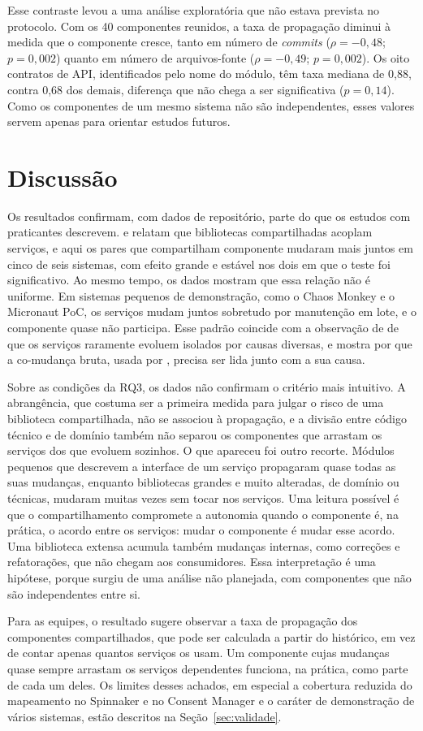 Esse contraste levou a uma análise exploratória que não estava prevista no protocolo. Com os 40 componentes reunidos, a taxa de propagação diminui à medida que o componente cresce, tanto em número de \textit{commits} ($\rho = -0{,}48$; $p = 0{,}002$) quanto em número de arquivos-fonte ($\rho = -0{,}49$; $p = 0{,}002$). Os oito contratos de API, identificados pelo nome do módulo, têm taxa mediana de 0,88, contra 0,68 dos demais, diferença que não chega a ser significativa ($p = 0{,}14$). Como os componentes de um mesmo sistema não são independentes, esses valores servem apenas para orientar estudos futuros.

\section{Discussão}
\label{sec:discussao}

Os resultados confirmam, com dados de repositório, parte do que os estudos com praticantes descrevem.  e  relatam que bibliotecas compartilhadas acoplam serviços, e aqui os pares que compartilham componente mudaram mais juntos em cinco de seis sistemas, com efeito grande e estável nos dois em que o teste foi significativo. Ao mesmo tempo, os dados mostram que essa relação não é uniforme. Em sistemas pequenos de demonstração, como o Chaos Monkey e o Micronaut PoC, os serviços mudam juntos sobretudo por manutenção em lote, e o componente quase não participa. Esse padrão coincide com a observação de  de que os serviços raramente evoluem isolados por causas diversas, e mostra por que a co-mudança bruta, usada por , precisa ser lida junto com a sua causa.

Sobre as condições da RQ3, os dados não confirmam o critério mais intuitivo. A abrangência, que costuma ser a primeira medida para julgar o risco de uma biblioteca compartilhada, não se associou à propagação, e a divisão entre código técnico e de domínio também não separou os componentes que arrastam os serviços dos que evoluem sozinhos. O que apareceu foi outro recorte. Módulos pequenos que descrevem a interface de um serviço propagaram quase todas as suas mudanças, enquanto bibliotecas grandes e muito alteradas, de domínio ou técnicas, mudaram muitas vezes sem tocar nos serviços. Uma leitura possível é que o compartilhamento compromete a autonomia quando o componente é, na prática, o acordo entre os serviços: mudar o componente é mudar esse acordo. Uma biblioteca extensa acumula também mudanças internas, como correções e refatorações, que não chegam aos consumidores. Essa interpretação é uma hipótese, porque surgiu de uma análise não planejada, com componentes que não são independentes entre si.

Para as equipes, o resultado sugere observar a taxa de propagação dos componentes compartilhados, que pode ser calculada a partir do histórico, em vez de contar apenas quantos serviços os usam. Um componente cujas mudanças quase sempre arrastam os serviços dependentes funciona, na prática, como parte de cada um deles. Os limites desses achados, em especial a cobertura reduzida do mapeamento no Spinnaker e no Consent Manager e o caráter de demonstração de vários sistemas, estão descritos na Seção~\ref{sec:validade}.
